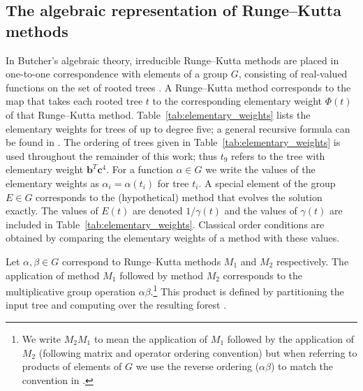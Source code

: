 \subsection{The algebraic representation of Runge--Kutta methods}\label{subsec:Algebraic_representation}

In Butcher's algebraic theory, irreducible Runge--Kutta methods
are placed in one-to-one correspondence with elements of a group
$G$, consisting of real-valued functions on the set of rooted trees \cite[Theorem~384A]{Butcher2008_book}.
A Runge--Kutta method corresponds to the map that takes each rooted tree $t$
to the corresponding elementary weight $\Phi(t)$ of that Runge--Kutta method.
Table~\ref{tab:elementary_weights} lists the elementary weights for trees of
up to degree five; a general recursive formula can be found in
\cite[Definition~312A]{Butcher2008_book}.
The ordering of trees given in Table~\ref{tab:elementary_weights} is used
throughout the remainder of this work; thus $t_9$ refers to the tree with
elementary weight $\bm{b}^T \bm{c}^4$.
For a function $\alpha \in G$ we write the values of the
elementary weights as $\alpha_{i} = \alpha(t_{i})$ for tree $t_{i}$.
A special element of the group $E \in G$ corresponds to the
(hypothetical) method that evolves the solution exactly.
The values of $E(t)$ are denoted $1/\gamma(t)$ \cite{Butcher2008_book}
and the values of $\gamma(t)$ are included in
Table~\ref{tab:elementary_weights}.
Classical order conditions are obtained by comparing the elementary weights 
of a method with these values.

Let $\alpha, \beta \in G$ correspond to Runge--Kutta methods $M_1$ and $M_2$
respectively.
The application of method $M_1$ followed by method $M_2$ corresponds to
the multiplicative group operation $\alpha\beta$.\footnote{We write
	$M_2M_1$ to mean the application of $M_1$
	followed by the application of $M_2$
	(following matrix and operator ordering convention)
	but when referring to products of elements of $G$
        we use the reverse ordering ($\alpha\beta$)
	to match the convention in \cite{Butcher2008_book}.}
This product is defined by partitioning the input tree and computing
over the resulting forest \cite[\S~383]{Butcher2008_book}.

